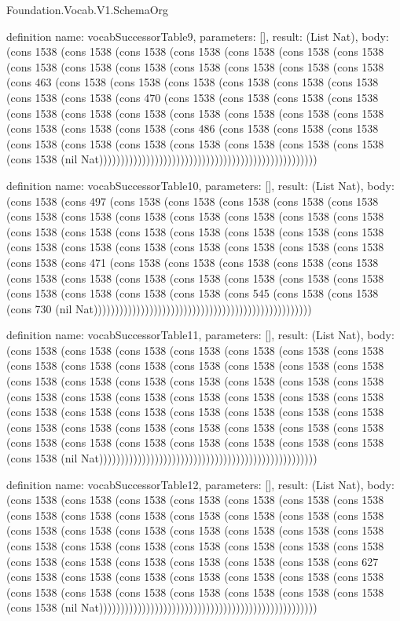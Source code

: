 \begin{lexlean}{Foundation.Vocab.V1.SchemaOrg}
\begin{semanticmodule}
definition{
  name: vocabSuccessorTable9,
  parameters: [],
  result: (List Nat),
  body: (cons 1538 (cons 1538 (cons 1538 (cons 1538 (cons 1538 (cons 1538 (cons 1538 (cons 1538 (cons 1538 (cons 1538 (cons 1538 (cons 1538 (cons 1538 (cons 1538 (cons 463 (cons 1538 (cons 1538 (cons 1538 (cons 1538 (cons 1538 (cons 1538 (cons 1538 (cons 1538 (cons 470 (cons 1538 (cons 1538 (cons 1538 (cons 1538 (cons 1538 (cons 1538 (cons 1538 (cons 1538 (cons 1538 (cons 1538 (cons 1538 (cons 1538 (cons 1538 (cons 1538 (cons 486 (cons 1538 (cons 1538 (cons 1538 (cons 1538 (cons 1538 (cons 1538 (cons 1538 (cons 1538 (cons 1538 (cons 1538 (cons 1538 (nil Nat)))))))))))))))))))))))))))))))))))))))))))))))))))
}

definition{
  name: vocabSuccessorTable10,
  parameters: [],
  result: (List Nat),
  body: (cons 1538 (cons 497 (cons 1538 (cons 1538 (cons 1538 (cons 1538 (cons 1538 (cons 1538 (cons 1538 (cons 1538 (cons 1538 (cons 1538 (cons 1538 (cons 1538 (cons 1538 (cons 1538 (cons 1538 (cons 1538 (cons 1538 (cons 1538 (cons 1538 (cons 1538 (cons 1538 (cons 1538 (cons 1538 (cons 1538 (cons 1538 (cons 1538 (cons 1538 (cons 471 (cons 1538 (cons 1538 (cons 1538 (cons 1538 (cons 1538 (cons 1538 (cons 1538 (cons 1538 (cons 1538 (cons 1538 (cons 1538 (cons 1538 (cons 1538 (cons 1538 (cons 1538 (cons 1538 (cons 545 (cons 1538 (cons 1538 (cons 730 (nil Nat)))))))))))))))))))))))))))))))))))))))))))))))))))
}

definition{
  name: vocabSuccessorTable11,
  parameters: [],
  result: (List Nat),
  body: (cons 1538 (cons 1538 (cons 1538 (cons 1538 (cons 1538 (cons 1538 (cons 1538 (cons 1538 (cons 1538 (cons 1538 (cons 1538 (cons 1538 (cons 1538 (cons 1538 (cons 1538 (cons 1538 (cons 1538 (cons 1538 (cons 1538 (cons 1538 (cons 1538 (cons 1538 (cons 1538 (cons 1538 (cons 1538 (cons 1538 (cons 1538 (cons 1538 (cons 1538 (cons 1538 (cons 1538 (cons 1538 (cons 1538 (cons 1538 (cons 1538 (cons 1538 (cons 1538 (cons 1538 (cons 1538 (cons 1538 (cons 1538 (cons 1538 (cons 1538 (cons 1538 (cons 1538 (cons 1538 (cons 1538 (cons 1538 (cons 1538 (cons 1538 (nil Nat)))))))))))))))))))))))))))))))))))))))))))))))))))
}

definition{
  name: vocabSuccessorTable12,
  parameters: [],
  result: (List Nat),
  body: (cons 1538 (cons 1538 (cons 1538 (cons 1538 (cons 1538 (cons 1538 (cons 1538 (cons 1538 (cons 1538 (cons 1538 (cons 1538 (cons 1538 (cons 1538 (cons 1538 (cons 1538 (cons 1538 (cons 1538 (cons 1538 (cons 1538 (cons 1538 (cons 1538 (cons 1538 (cons 1538 (cons 1538 (cons 1538 (cons 1538 (cons 1538 (cons 1538 (cons 1538 (cons 1538 (cons 1538 (cons 1538 (cons 1538 (cons 1538 (cons 627 (cons 1538 (cons 1538 (cons 1538 (cons 1538 (cons 1538 (cons 1538 (cons 1538 (cons 1538 (cons 1538 (cons 1538 (cons 1538 (cons 1538 (cons 1538 (cons 1538 (cons 1538 (nil Nat)))))))))))))))))))))))))))))))))))))))))))))))))))
}


\end{semanticmodule}
\end{lexlean}
